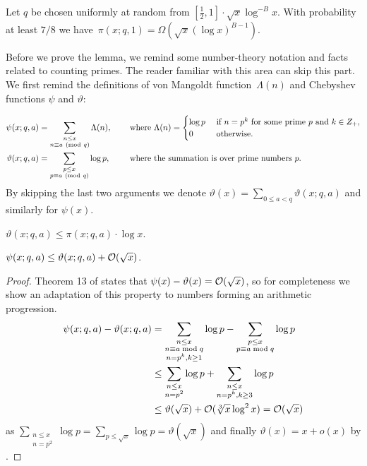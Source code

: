 \begin{lemma}\label{le:many_p_equal_1_mod_q}
 Let $q$ be chosen uniformly at random from $[\frac12,1]\cdot \sqrt{x}\log^{-B} x$.
 With probability at least $7/8$ we have~$\pi(x;q,1) = \Omega(\sqrt{x}(\log x)^{B-1})$.
\end{lemma}

Before we prove the lemma, we remind some number-theory notation and facts related to counting primes. 
The reader familiar with this area can skip this part.
We first remind the definitions of von Mangoldt function~$\Lambda(n)$ and Chebyshev functions $\psi$ and $\vartheta$:

\begin{align*}
\psi(x;q,a) &= \sum_{\substack{n\leq x\\ n\equiv a \ (\mathrm{mod}\ q)}} \Lambda(n), \quad &\text{ where } &\Lambda(n) = \begin{cases} \log p  &\text{ if } n=p^{k} \text{ for some prime } p \text{ and } k \in Z_+, \\  0 &\text{ otherwise. } \end{cases} \\ 
\vartheta(x;q,a) &= \sum_{\substack{p\leq x \\ p \equiv a\ (\mathrm{mod}\ q)}} \log p, \quad &\text{ where } &\text{the summation is over prime numbers $p$.
}
\end{align*}
\noindent
By skipping the last two arguments we denote $\vartheta(x) = \sum_{0\leq a<q} \vartheta(x;q,a)$ and similarly for $\psi(x)$.

\begin{fact}[By definition]\label{fa:vartheta_pi}
 $ \vartheta(x;q,a) \leq  \pi(x;q,a)\cdot\log x$.
\end{fact}

\begin{fact}\label{fa:psi_vartheta}
$\psi(x;q,a) \leq \vartheta(x;q,a) + \mathcal{O}(\sqrt x)$.
\end{fact}
\begin{proof}
Theorem 13 of \cite{RosserS62} states that $\psi(x) - \vartheta(x) = \mathcal{O}(\sqrt x)$, so for completeness we show an adaptation of this property to numbers forming an arithmetic progression.
 \begin{align*}
  \psi(x;q,a) - \vartheta(x;q,a)&= \sum_{\substack{n \leq x \\ n \equiv a  \bmod q \\ n= p ^k, k\geq 1}} \log p - \sum_{\substack{p \leq x \\ p \equiv a  \bmod q }} \log p \\
  &\leq \sum_{\substack{n \leq x \\ n= p ^2}} \log p  + \sum_{\substack{n \leq x \\ n= p ^k, k\geq 3}} \log p\\  
  &\leq \vartheta(\sqrt x)+ \mathcal{O}(\sqrt[3]{x}\log^2x) = \mathcal{O}(\sqrt x)
 \end{align*}
as $\sum_{\substack{n \leq x \\ n= p ^2}} \log p  = \sum_{p\leq \sqrt x} \log p = \vartheta(\sqrt x) $ and finally  $\vartheta(x)= x+ o(x)$ by \cite[(2.29)]{RosserS62}.
\end{proof}

